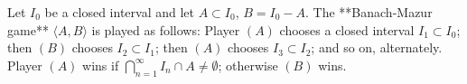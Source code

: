 Let $I_0$ be a closed interval and let $A \subset I_0$, $B = I_0 - A$. The **Banach-Mazur game** $\langle A, B \rangle$ is played as follows: Player $(A)$ chooses a closed interval $I_1 \subset I_0$; then $(B)$ chooses $I_2 \subset I_1$; then $(A)$ chooses $I_3 \subset I_2$; and so on, alternately. Player $(A)$ wins if $\bigcap_{n=1}^{\infty} I_n \cap A \neq \emptyset$; otherwise $(B)$ wins.